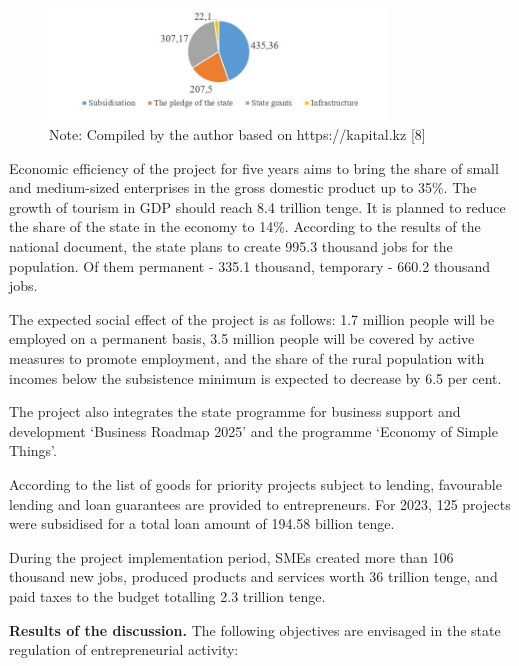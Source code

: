 \begin{figure}[H]
	\centering
	\includegraphics[width=0.8\textwidth]{media/ekon/image2.2}
	\caption*{ Figure 2 - Methods and volume of entrepreneurship financing
  under the `National Entrepreneurship Development Project for 2021-2025'}
	\caption*{Note: Compiled by the author based on https://kapital.kz {[}8{]}}
\end{figure}


\begin{multicols}{2}

Economic efficiency of the project for five years aims to bring the
share of small and medium-sized enterprises in the gross domestic
product up to 35\%. The growth of tourism in GDP should reach 8.4
trillion tenge. It is planned to reduce the share of the state in the
economy to 14\%. According to the results of the national document, the
state plans to create 995.3 thousand jobs for the population. Of them
permanent - 335.1 thousand, temporary - 660.2 thousand jobs.

The expected social effect of the project is as follows: 1.7 million
people will be employed on a permanent basis, 3.5 million people will be
covered by active measures to promote employment, and the share of the
rural population with incomes below the subsistence minimum is expected
to decrease by 6.5 per cent.

The project also integrates the state programme for business support and
development `Business Roadmap 2025' and the programme `Economy of Simple
Things'.

According to the list of goods for priority projects subject to lending,
favourable lending and loan guarantees are provided to entrepreneurs.
For 2023, 125 projects were subsidised for a total loan amount of 194.58
billion tenge.

During the project implementation period, SMEs created more than 106
thousand new jobs, produced products and services worth 36 trillion
tenge, and paid taxes to the budget totalling 2.3 trillion tenge.

{\bfseries Results of the discussion.} The following objectives are
envisaged in the state regulation of entrepreneurial activity:


\end{multicols}
